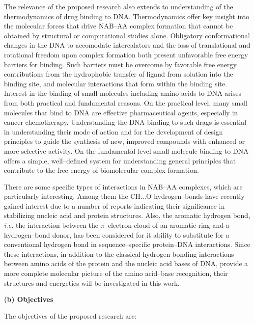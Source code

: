 The relevance of the proposed research also extends to
understanding of the thermodynamics of drug binding to DNA. 
Thermodynamics offer key
insight into
the molecular forces that drive NAB--AA complex formation that cannot be
obtained
by structural or computational studies alone.
Obligatory conformational changes in the DNA to accomodate intercalators
and the loss of translational and rotational freedom upon complex
formation both present unfavorable free energy barriers for binding. Such
barriers must be overcome by favorable free energy contributions from the
hydrophobic transfer of ligand from solution into the binding site, and
molecular interactions that form within the binding site.\cite{e1}
Interest in the binding of small molecules including amino acids
to DNA arises from both practical and fundamental reasons. On the
practical level, many small molecules that bind to DNA are effective
pharmaceutical agents, especially in cancer chemotherapy. Understanding
the DNA binding to such drags is essential in understanding their mode of
action and for the development of design principles to guide the synthesis
of new, improved compounds with enhanced or more selective activity. On
the fundamental level small molecule binding to DNA offers a simple,
well--defined system for understanding general principles that contribute
to the free energy of biomolecular complex formation. 


There are some specific types of interactions in NAB--AA
complexes, which are 
particularly interesting. Among them 
the CH$\dots$O hydrogen--bonds have recently gained interest due
to a number of reports indicating their significance in stabilizing
nucleic acid and protein structures.\cite{a1}
Also, the aromatic hydrogen bond, {\it i.e.} the interaction
between the $\pi$--electron cloud of an aromatic ring and a
hydrogen--bond donor, has been considered for it ability to substitute for
a conventional hydrogen bond in sequence--specific protein--DNA
interactions.\cite{a2}
Since these interactions, in addition to the classical hydrogen
bonding interactions between amino acids of the protein and the nucleic
acid bases of DNA, provide a more complete molecular picture of the
amino acid--base recognition, their structures and energetics
will be investigated in this work.


\vspace{3mm}

{\bf (b) Objectives}

The objectives of the proposed research are:

